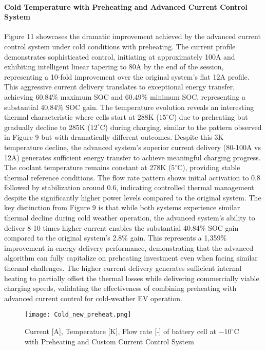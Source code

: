 \documentclass[conference]{IEEEtran}
\begin{document}
\paragraph{\textbf{Cold Temperature with Preheating and Advanced Current Control System}}
Figure 11 showcases the dramatic improvement achieved by the advanced current control system under cold conditions with preheating. The current profile demonstrates sophisticated control, initiating at approximately 100A and exhibiting intelligent linear tapering to 80A by the end of the session, representing a 10-fold improvement over the original system's flat 12A profile. This aggressive current delivery translates to exceptional energy transfer, achieving 60.84$\%$ maximum SOC and 60.49$\%$ minimum SOC, representing a substantial 40.84$\%$ SOC gain.
The temperature evolution reveals an interesting thermal characteristic where cells start at 288K ($15^\circ$C) due to preheating but gradually decline to 285K ($12^\circ$C) during charging, similar to the pattern observed in Figure 9 but with dramatically different outcomes. Despite this 3K temperature decline, the advanced system's superior current delivery (80-100A vs 12A) generates sufficient energy transfer to achieve meaningful charging progress. The coolant temperature remains constant at 278K ($5^\circ$C), providing stable thermal reference conditions.
The flow rate pattern shows initial activation to 0.8 followed by stabilization around 0.6, indicating controlled thermal management despite the significantly higher power levels compared to the original system. The key distinction from Figure 9 is that while both systems experience similar thermal decline during cold weather operation, the advanced system's ability to deliver 8-10 times higher current enables the substantial 40.84$\%$ SOC gain compared to the original system's 2.8$\%$ gain.
This represents a 1,359$\%$ improvement in energy delivery performance, demonstrating that the advanced algorithm can fully capitalize on preheating investment even when facing similar thermal challenges. The higher current delivery generates sufficient internal heating to partially offset the thermal losses while delivering commercially viable charging speeds, validating the effectiveness of combining preheating with advanced current control for cold-weather EV operation.


\begin{figure}[H]
    \centering
    \texttt{[image: Cold\_new\_preheat.png]}
    \caption{Current [A], Temperature [K], Flow rate [-] of battery cell at $-10^\circ$C with Preheating and Custom Current Control System }
    \label{fig:enter-label}
\end{figure}
\end{document}
